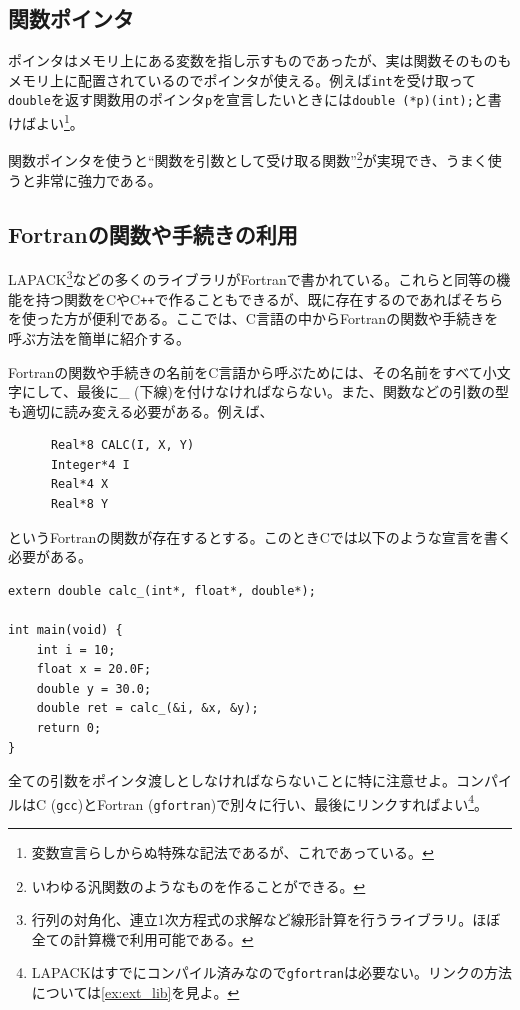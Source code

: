 \subsection{関数ポインタ}
ポインタはメモリ上にある変数を指し示すものであったが、実は関数そのものもメモリ上に配置されているのでポインタが使える。例えば\texttt{int}を受け取って\texttt{double}を返す関数用のポインタ\texttt{p}を宣言したいときには\texttt{double (*p)(int);}と書けばよい\footnote{変数宣言らしからぬ特殊な記法であるが、これであっている。}。

関数ポインタを使うと``関数を引数として受け取る関数''\footnote{いわゆる汎関数のようなものを作ることができる。}が実現でき、うまく使うと非常に強力である。

\subsection {Fortranの関数や手続きの利用}

LAPACK\footnote{行列の対角化、連立1次方程式の求解など線形計算を行うライブラリ。ほぼ全ての計算機で利用可能である。}などの多くのライブラリがFortranで書かれている。これらと同等の機能を持つ関数をCやC\texttt{++}で作ることもできるが、既に存在するのであればそちらを使った方が便利である。ここでは、C言語の中からFortranの関数や手続きを呼ぶ方法を簡単に紹介する。

Fortranの関数や手続きの名前をC言語から呼ぶためには、その名前をすべて小文字にして、最後に\_ (下線)を付けなければならない。また、関数などの引数の型も適切に読み変える必要がある。例えば、
\begin{reidai}\label{ex:fort}
    \begin{verbatim}
      Real*8 CALC(I, X, Y)
      Integer*4 I
      Real*4 X
      Real*8 Y
\end{verbatim}
\end{reidai} \noindent
というFortranの関数が存在するとする。このときCでは以下のような宣言を書く必要がある。
\begin{reidai}
    \begin{verbatim}
extern double calc_(int*, float*, double*);

int main(void) {
    int i = 10;
    float x = 20.0F;
    double y = 30.0;
    double ret = calc_(&i, &x, &y);
    return 0;
}
\end{verbatim}
\end{reidai} \noindent
全ての引数をポインタ渡しとしなければならないことに特に注意せよ。コンパイルはC (\texttt{gcc})とFortran (\texttt{gfortran})で別々に行い、最後にリンクすればよい\footnote{LAPACKはすでにコンパイル済みなので\texttt{gfortran}は必要ない。リンクの方法については\ref{ex:ext_lib}を見よ。}。

